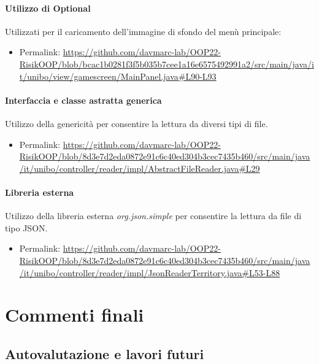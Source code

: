 \documentclass[a4paper,12pt]{report}
\begin{document}
\subsubsection*{Utilizzo di Optional}
%
Utilizzati per il caricamento dell'immagine di sfondo del men\`u principale:
\begin{itemize}
    \item Permalink: \url{https://github.com/davmarc-lab/OOP22-RisikOOP/blob/bcac1b0281f3f5b035b7cee1a16e6575492991a2/src/main/java/it/unibo/view/gamescreen/MainPanel.java#L90-L93}
\end{itemize}
%
\subsubsection*{Interfaccia e classe astratta generica}
%
Utilizzo della genericit\`a per consentire la lettura da diversi tipi di file.
\begin{itemize}
    \item Permalink: \url{https://github.com/davmarc-lab/OOP22-RisikOOP/blob/8d3e7d2eda0872e91c6c40ed304b3cec7435b460/src/main/java/it/unibo/controller/reader/impl/AbstractFileReader.java#L29}
\end{itemize}
%
\subsubsection*{Libreria esterna}
%
Utilizzo della libreria esterna \textit{org.json.simple} per consentire la lettura da file di tipo JSON.
\begin{itemize}
    \item Permalink: \url{https://github.com/davmarc-lab/OOP22-RisikOOP/blob/8d3e7d2eda0872e91c6c40ed304b3cec7435b460/src/main/java/it/unibo/controller/reader/impl/JsonReaderTerritory.java#L53-L88}
\end{itemize}

\chapter{Commenti finali}
%
\section{Autovalutazione e lavori futuri}
%
\end{document}

